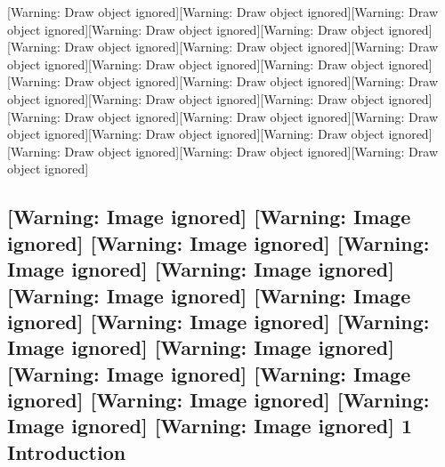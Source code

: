[Warning: Draw object ignored][Warning: Draw object ignored][Warning: Draw object ignored][Warning: Draw object ignored][Warning: Draw object ignored][Warning: Draw object ignored][Warning: Draw object ignored][Warning: Draw object ignored][Warning: Draw object ignored][Warning: Draw object ignored][Warning: Draw object ignored][Warning: Draw object ignored][Warning: Draw object ignored][Warning: Draw object ignored][Warning: Draw object ignored][Warning: Draw object ignored][Warning: Draw object ignored][Warning: Draw object ignored][Warning: Draw object ignored][Warning: Draw object ignored][Warning: Draw object ignored][Warning: Draw object ignored][Warning: Draw object ignored]\clearpage\setcounter{page}{1}\subsection[1 Introduction]{  [Warning: Image ignored] %
   [Warning: Image ignored] %
   [Warning: Image ignored] %
   [Warning: Image ignored] %
   [Warning: Image ignored] %
   [Warning: Image ignored] %
   [Warning: Image ignored] %
   [Warning: Image ignored] %
   [Warning: Image ignored] %
   [Warning: Image ignored] %
   [Warning: Image ignored] %
   [Warning: Image ignored] %
   [Warning: Image ignored] %
   [Warning: Image ignored] %
   [Warning: Image ignored] %
 \textmd{1}\textmd{ }Introduction}
